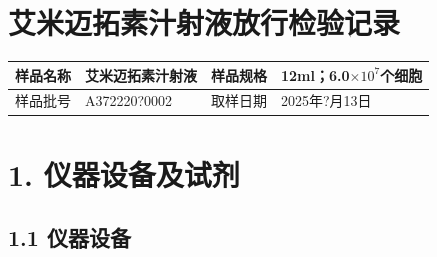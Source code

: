 \documentclass[UTF8,10pt,a4paper,fontset=fandol]{ctexart}
\newcommand{\fieldvalue}[1]{#1}
\newcommand{\handwritten}[1]{#1}
\begin{document}
\newpage

\section*{艾米迈拓素汁射液放行检验记录}

\begin{tabularx}{\textwidth}{|p{3cm}|X|p{3cm}|X|}
\hline
样品名称 & 艾米迈拓素汁射液 & 样品规格 & 12ml；6.0$\times 10^{7}$个细胞 \\
\hline
样品批号 &
\fieldvalue{\handwritten{A372220?0002}} &
取样日期 & 2025年?月13日 \\
\hline
\end{tabularx}

\section*{1. 仪器设备及试剂}

\subsection*{1.1 仪器设备}
\end{document}
